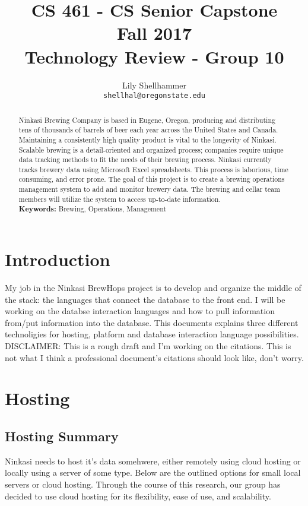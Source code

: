 \documentclass[draftclsnofoot,onecolumn,letterpaper,10pt,compsoc]{IEEEtran}
\title{CS 461 - CS Senior Capstone
	\\Fall 2017
	\\Technology Review - Group 10
}
\author{
	Lily Shellhammer \\
	\texttt{shellhal@oregonstate.edu}
}
\begin{document}
\begin{titlingpage}
    \maketitle
    \begin{abstract}
      Ninkasi Brewing Company is based in Eugene, Oregon, producing and distributing tens of thousands of barrels of beer each year across the United States and Canada.
      Maintaining a consistently high quality product is vital to the longevity of Ninkasi.
      Scalable brewing is a detail-oriented and organized process; companies require unique data tracking methods to fit the needs of their brewing process.
      Ninkasi currently tracks brewery data using Microsoft Excel spreadsheets.
      This process is laborious, time consuming, and error prone.
      The goal of this project is to create a brewing operations management system to add and monitor brewery data.
      The brewing and cellar team members will utilize the system to access up-to-date information.
      \\
      \textbf{Keywords:} Brewing, Operations, Management
    \end{abstract}
		\pagebreak
		\tableofcontents
\end{titlingpage}

\section{Introduction}
My job in the Ninkasi BrewHops project is to develop and organize the middle of the stack: the languages that connect the database to the front end.
I will be working on the databse interaction languages and how to pull information from/put information into the database.
This documents explains three different technoligies for hosting, platform and database interaction language possibilities.
\\
DISCLAIMER: This is a rough draft and I'm working on the citations. This is not what I think a professional document's citations should look like, don't worry.
\section{Hosting}
    \subsection{Hosting Summary}
		Ninkasi needs to host it's data somehwere, either remotely using cloud hosting or locally using a server of some type.
		Below are the outlined options for small local servers or cloud hosting.
		Through the course of this research, our group has decided to use cloud hosting for its flexibility, ease of use, and scalability.
\end{document}
